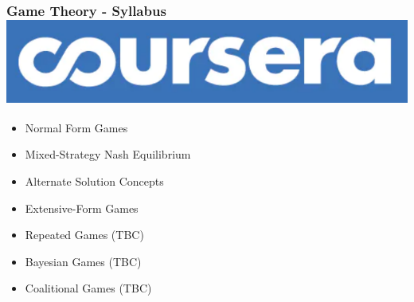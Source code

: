 \begin{frame}
    \frametitle{Game Theory - Syllabus \hspace{2.65cm}
    \includegraphics[width=.4\textwidth]{Bin/Coursera.png}}

    \begin{itemize}
        \item Normal Form Games
        \item Mixed-Strategy Nash Equilibrium
        \item Alternate Solution Concepts
        \item Extensive-Form Games
        \item Repeated Games (TBC)
        \item Bayesian Games (TBC)
        \item Coalitional Games (TBC)
    \end{itemize}
\end{frame}